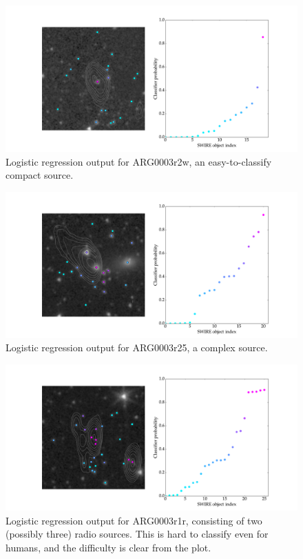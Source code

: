 \documentclass[a4paper]{article}
\begin{document}
    \begin{figure}[!ht]
      \centering
      \includegraphics[width=\linewidth]{images/ARG0003r2w_lr.pdf}
      \caption{Logistic regression output for ARG0003r2w, an easy-to-classify compact source.}
      \label{fig:ARG0003r2w_lr}
    \end{figure}

    \begin{figure}[!ht]
      \centering
      \includegraphics[width=\linewidth]{images/ARG0003r25_lr.pdf}
      \caption{Logistic regression output for ARG0003r25, a complex source.}
      \label{fig:ARG0003r25_lr}
    \end{figure}

    \begin{figure}[!ht]
      \centering
      \includegraphics[width=\linewidth]{images/ARG0003r1r_lr.pdf}
      \caption{Logistic regression output for ARG0003r1r, consisting of two (possibly three) radio sources. This is hard to classify even for humans, and the difficulty is clear from the plot.}
      \label{fig:ARG0003r1r_lr}
    \end{figure}
\end{document}
